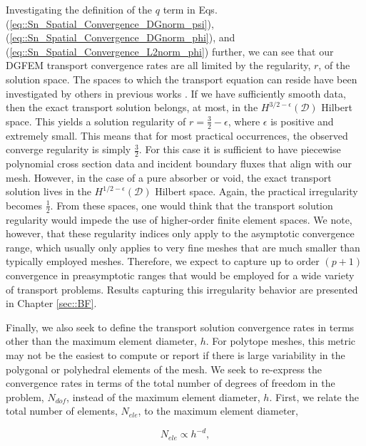 Investigating the definition of the $q$ term in Eqs. (\ref{eq::Sn_Spatial_Convergence_DGnorm_psi}), (\ref{eq::Sn_Spatial_Convergence_DGnorm_phi}), and (\ref{eq::Sn_Spatial_Convergence_L2norm_phi}) further, we can see that our DGFEM transport convergence rates are all limited by the regularity, $r$, of the solution space. The spaces to which the transport equation can reside have been investigated by others in previous works \cite{wang2009convergence,magenes1970problemes,johnson1983convergence}. If we have sufficiently smooth data, then the exact transport solution belongs, at most, in the $H^{3/2-\epsilon} (\mathcal{D})$ Hilbert space. This yields a solution regularity of $r=\frac{3}{2}-\epsilon$, where $\epsilon$ is positive and extremely small. This means that for most practical occurrences, the observed converge regularity is simply $\frac{3}{2}$. For this case it is sufficient to have piecewise polynomial cross section data and incident boundary fluxes that align with our mesh. However, in the case of a pure absorber or void, the exact transport solution lives in the $H^{1/2-\epsilon} (\mathcal{D})$ Hilbert space. Again, the practical irregularity becomes $\frac{1}{2}$. From these spaces, one would think that the transport solution regularity would impede the use of higher-order finite element spaces. We note, however, that these regularity indices only apply to the asymptotic convergence range, which usually only applies to very fine meshes that are much smaller than typically employed meshes. Therefore, we expect to capture up to order $(p+1)$ convergence in preasymptotic ranges that would be employed for a wide variety of transport problems. Results capturing this irregularity behavior are presented in Chapter \ref{sec::BF}.

Finally, we also seek to define the transport solution convergence rates in terms other than the maximum element diameter, $h$. For polytope meshes, this metric may not be the easiest to compute or report if there is large variability in the polygonal or polyhedral elements of the mesh. We seek to re-express the convergence rates in terms of the total number of degrees of freedom in the problem, $N_{dof}$, instead of the maximum element diameter, $h$. First, we relate the total number of elements, $N_{ele}$, to the maximum element diameter,

\begin{equation}
\label{eq::Sn_Spatial_Convergence_Nele_to_h}
N_{ele} \propto h^{-d},
\end{equation}

